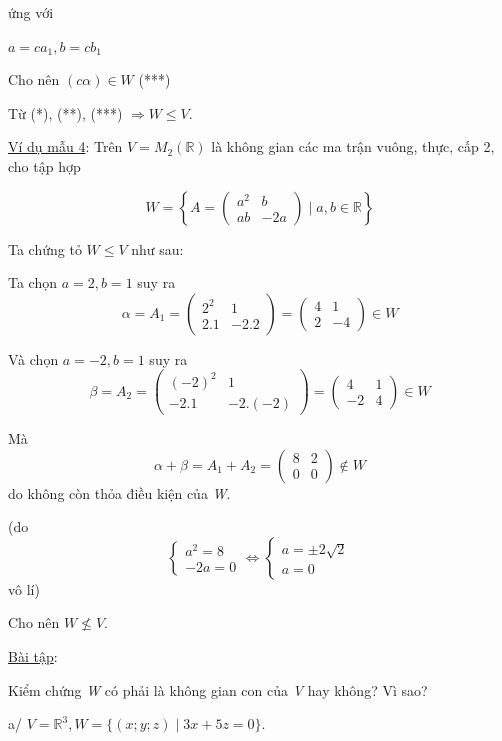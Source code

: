 \documentclass[12pt,a4paper]{article}
\begin{document}
ứng với

$a = ca_1, b = cb_1$

Cho nên $(c\alpha) \in W$ (***)

Từ (*), (**), (***)
$\Rightarrow W \le V$.

\ul{Ví dụ mẫu 4}: Trên
$V = M_2(\mathbb{R})$ là không gian
các ma trận vuông, thực, cấp 2, cho tập hợp

\[ W = \left\{ A = \begin{pmatrix} a^2 & b \\ ab & -2a \end{pmatrix} \mid a, b \in \mathbb{R} \right\} \]

Ta chứng tỏ $W \le V$ như
sau:

Ta chọn $a=2, b=1$ suy ra
\[ \alpha = A_1 = \begin{pmatrix} 2^2 & 1 \\ 2.1 & -2.2 \end{pmatrix} = \begin{pmatrix} 4 & 1 \\ 2 & -4 \end{pmatrix} \in W \]

Và chọn $a=-2, b=1$ suy ra
\[ \beta = A_2 = \begin{pmatrix} (-2)^2 & 1 \\ -2.1 & -2.(-2) \end{pmatrix} = \begin{pmatrix} 4 & 1 \\ -2 & 4 \end{pmatrix} \in W \]

Mà \[ \alpha + \beta = A_1 + A_2 = \begin{pmatrix} 8 & 2 \\ 0 & 0 \end{pmatrix} \notin W \] do không còn
thỏa điều kiện của \emph{W}.

(do \[ \begin{cases} a^2 = 8 \\ -2a = 0 \end{cases} \Leftrightarrow \begin{cases} a = \pm 2\sqrt{2} \\ a = 0 \end{cases} \] vô lí)

Cho nên $W \not\le V$.

\ul{Bài tập}:

Kiểm chứng \emph{W} có phải là không gian con của \emph{V} hay không? Vì
sao?

a/ $V = \mathbb{R}^3, W = \{(x; y; z) \mid 3x + 5z = 0\}$.
\end{document}
